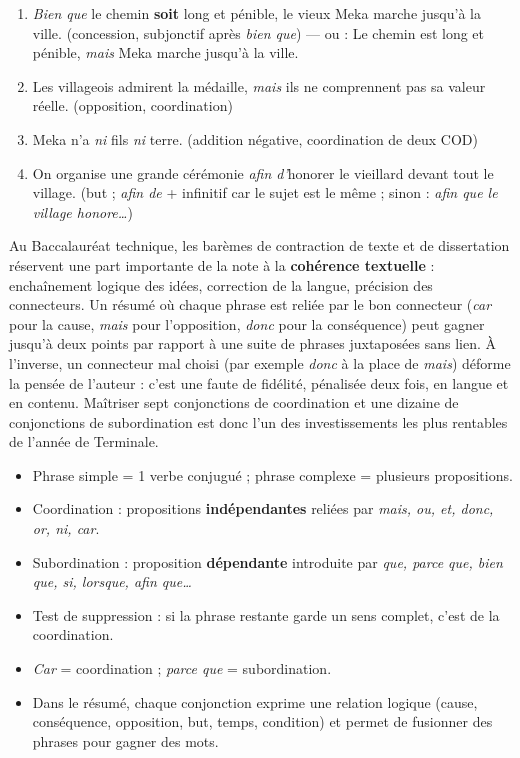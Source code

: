\documentclass[11pt]{article}
\begin{document}
\begin{corrige}
\begin{enumerate}
\item \emph{Bien que} le chemin \textbf{soit} long et pénible, le vieux Meka marche jusqu'à la ville. (concession, subjonctif après \emph{bien que}) — ou : Le chemin est long et pénible, \emph{mais} Meka marche jusqu'à la ville.
\item Les villageois admirent la médaille, \emph{mais} ils ne comprennent pas sa valeur réelle. (opposition, coordination)
\item Meka n'a \emph{ni} fils \emph{ni} terre. (addition négative, coordination de deux COD)
\item On organise une grande cérémonie \emph{afin d'}honorer le vieillard devant tout le village. (but ; \emph{afin de} + infinitif car le sujet est le même ; sinon : \emph{afin que le village honore\ldots})
\end{enumerate}
\end{corrige}

\begin{savaistu}
Au Baccalauréat technique, les barèmes de contraction de texte et de dissertation réservent une part importante de la note à la \textbf{cohérence textuelle} : enchaînement logique des idées, correction de la langue, précision des connecteurs. Un résumé où chaque phrase est reliée par le bon connecteur (\emph{car} pour la cause, \emph{mais} pour l'opposition, \emph{donc} pour la conséquence) peut gagner jusqu'à deux points par rapport à une suite de phrases juxtaposées sans lien. À l'inverse, un connecteur mal choisi (par exemple \emph{donc} à la place de \emph{mais}) déforme la pensée de l'auteur : c'est une faute de fidélité, pénalisée deux fois, en langue et en contenu. Maîtriser sept conjonctions de coordination et une dizaine de conjonctions de subordination est donc l'un des investissements les plus rentables de l'année de Terminale.
\end{savaistu}

\begin{aretenir}
\begin{itemize}
\item Phrase simple = 1 verbe conjugué ; phrase complexe = plusieurs propositions.
\item Coordination : propositions \textbf{indépendantes} reliées par \emph{mais, ou, et, donc, or, ni, car}.
\item Subordination : proposition \textbf{dépendante} introduite par \emph{que, parce que, bien que, si, lorsque, afin que\ldots}
\item Test de suppression : si la phrase restante garde un sens complet, c'est de la coordination.
\item \emph{Car} = coordination ; \emph{parce que} = subordination.
\item Dans le résumé, chaque conjonction exprime une relation logique (cause, conséquence, opposition, but, temps, condition) et permet de fusionner des phrases pour gagner des mots.
\end{itemize}
\end{aretenir}
\end{document}
